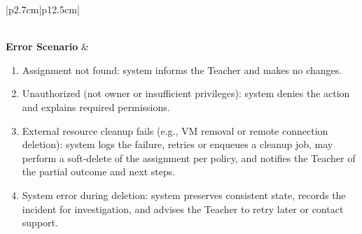 \begin{table}[H]
\begin{tabular}{|p{2.7cm}|p{12.5cm}|}
\begin{minipage}[t]{\linewidth}
\begin{enumerate}[topsep=0pt,itemsep=1pt,parsep=0pt,partopsep=0pt]
            \end{enumerate}
        \end{minipage} \\ \hline
        \textbf{Error Scenario} & \begin{minipage}[t]{\linewidth}
            \begin{enumerate}[topsep=0pt,itemsep=1pt,parsep=0pt,partopsep=0pt]
                \item Assignment not found: system informs the Teacher and makes no changes.
                \item Unauthorized (not owner or insufficient privileges): system denies the action and explains required permissions.
                \item External resource cleanup fails (e.g., VM removal or remote connection deletion): system logs the failure, retries or enqueues a cleanup job, may perform a soft‑delete of the assignment per policy, and notifies the Teacher of the partial outcome and next steps.
                \item System error during deletion: system preserves consistent state, records the incident for investigation, and advises the Teacher to retry later or contact support.
            \end{enumerate}
        \end{minipage} \\ \hline
    \end{tabular}
    \label{tab:teacher-delete-vm-assignment}
\end{table}


